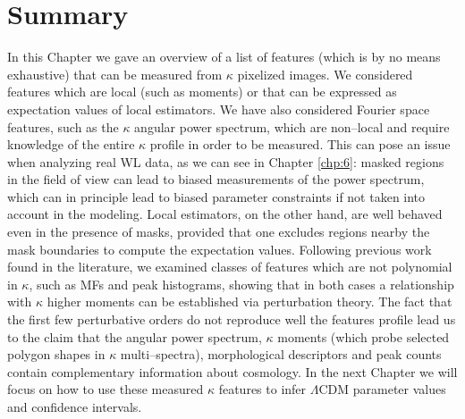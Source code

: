 \section{Summary}
In this Chapter we gave an overview of a list of features (which is by no means exhaustive) that can be measured from $\kappa$ pixelized images. We considered features which are local (such as moments) or that can be expressed as expectation values of local estimators. We have also considered Fourier space features, such as the $\kappa$ angular power spectrum, which are non--local and require knowledge of the entire $\kappa$ profile in order to be measured. This can pose an issue when analyzing real WL data, as we can see in Chapter \ref{chp:6}: masked regions in the field of view can lead to biased measurements of the power spectrum, which can in principle lead to biased parameter constraints if not taken into account in the modeling. Local estimators, on the other hand, are well behaved even in the presence of masks, provided that one excludes regions nearby the mask boundaries to compute the expectation values. Following previous work found in the literature, we examined classes of features which are not polynomial in $\kappa$, such as MFs and peak histograms, showing that in both cases a relationship with $\kappa$ higher moments can be established via perturbation theory. The fact that the first few perturbative orders do not reproduce well the features profile lead us to the claim that the angular power spectrum, $\kappa$ moments (which probe selected polygon shapes in $\kappa$ multi--spectra), morphological descriptors and peak counts contain complementary information about cosmology. In the next Chapter we will focus on how to use these measured $\kappa$ features to infer $\Lambda$CDM parameter values and confidence intervals.       

%